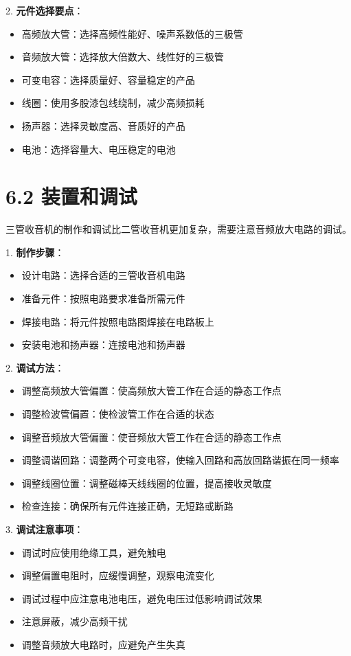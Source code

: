 \documentclass[12pt,UTF8]{ctexbook}
\begin{document}
2. \textbf{元件选择要点}：
   \begin{itemize}[leftmargin=3.5em]
   \item 高频放大管：选择高频性能好、噪声系数低的三极管
   \item 音频放大管：选择放大倍数大、线性好的三极管
   \item 可变电容：选择质量好、容量稳定的产品
   \item 线圈：使用多股漆包线绕制，减少高频损耗
   \item 扬声器：选择灵敏度高、音质好的产品
   \item 电池：选择容量大、电压稳定的电池
   \end{itemize}

\section*{6.2 装置和调试}

三管收音机的制作和调试比二管收音机更加复杂，需要注意音频放大电路的调试。

1. \textbf{制作步骤}：
   \begin{itemize}[leftmargin=3.5em]
   \item 设计电路：选择合适的三管收音机电路
   \item 准备元件：按照电路要求准备所需元件
   \item 焊接电路：将元件按照电路图焊接在电路板上
   \item 安装电池和扬声器：连接电池和扬声器
   \end{itemize}

2. \textbf{调试方法}：
   \begin{itemize}[leftmargin=3.5em]
   \item 调整高频放大管偏置：使高频放大管工作在合适的静态工作点
   \item 调整检波管偏置：使检波管工作在合适的状态
   \item 调整音频放大管偏置：使音频放大管工作在合适的静态工作点
   \item 调整调谐回路：调整两个可变电容，使输入回路和高放回路谐振在同一频率
   \item 调整线圈位置：调整磁棒天线线圈的位置，提高接收灵敏度
   \item 检查连接：确保所有元件连接正确，无短路或断路
   \end{itemize}

3. \textbf{调试注意事项}：
   \begin{itemize}[leftmargin=3.5em]
   \item 调试时应使用绝缘工具，避免触电
   \item 调整偏置电阻时，应缓慢调整，观察电流变化
   \item 调试过程中应注意电池电压，避免电压过低影响调试效果
   \item 注意屏蔽，减少高频干扰
   \item 调整音频放大电路时，应避免产生失真
   \end{itemize}
\end{document}
